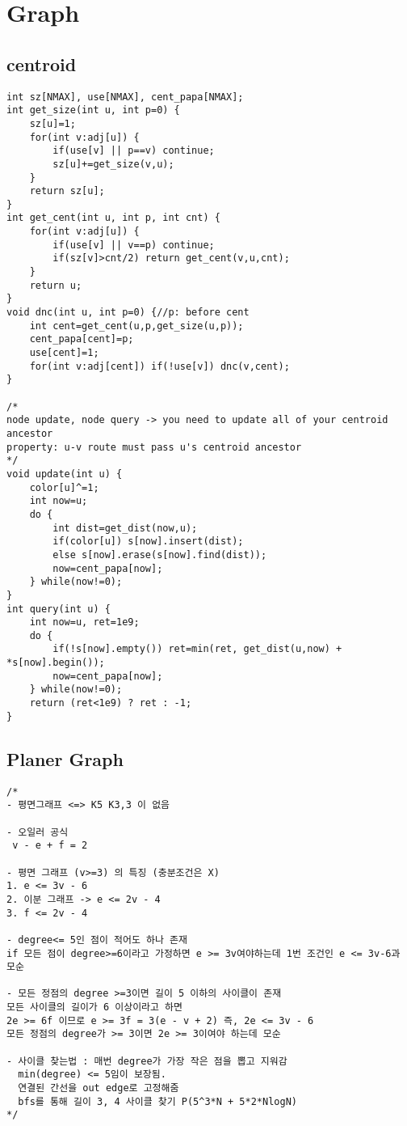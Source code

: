 \documentclass[landscape, 8pt, a4paper, oneside, twocolumn]{extarticle}
\begin{document}
\section{Graph}
\subsection {centroid}
\begin{verbatim}
int sz[NMAX], use[NMAX], cent_papa[NMAX];
int get_size(int u, int p=0) {
    sz[u]=1;
    for(int v:adj[u]) {
        if(use[v] || p==v) continue;
        sz[u]+=get_size(v,u);
    }
    return sz[u];
}
int get_cent(int u, int p, int cnt) {
    for(int v:adj[u]) {
        if(use[v] || v==p) continue;
        if(sz[v]>cnt/2) return get_cent(v,u,cnt);
    }
    return u;
}
void dnc(int u, int p=0) {//p: before cent
    int cent=get_cent(u,p,get_size(u,p));
    cent_papa[cent]=p;
    use[cent]=1;
    for(int v:adj[cent]) if(!use[v]) dnc(v,cent);
}

/*
node update, node query -> you need to update all of your centroid ancestor
property: u-v route must pass u's centroid ancestor 
*/
void update(int u) {
    color[u]^=1;
    int now=u;
    do {
        int dist=get_dist(now,u);
        if(color[u]) s[now].insert(dist);
        else s[now].erase(s[now].find(dist));
        now=cent_papa[now];
    } while(now!=0);    
}
int query(int u) {
    int now=u, ret=1e9;
    do {        
        if(!s[now].empty()) ret=min(ret, get_dist(u,now) + *s[now].begin());
        now=cent_papa[now];        
    } while(now!=0);
    return (ret<1e9) ? ret : -1;
}
\end{verbatim}
\newpage

\subsection{Planer Graph}
\begin{verbatim}
/*
- 평면그래프 <=> K5 K3,3 이 없음

- 오일러 공식 
 v - e + f = 2

- 평면 그래프 (v>=3) 의 특징 (충분조건은 X)
1. e <= 3v - 6
2. 이분 그래프 -> e <= 2v - 4
3. f <= 2v - 4

- degree<= 5인 점이 적어도 하나 존재
if 모든 점이 degree>=6이라고 가정하면 e >= 3v여야하는데 1번 조건인 e <= 3v-6과 모순

- 모든 정점의 degree >=3이면 길이 5 이하의 사이클이 존재
모든 사이클의 길이가 6 이상이라고 하면
2e >= 6f 이므로 e >= 3f = 3(e - v + 2) 즉, 2e <= 3v - 6
모든 정점의 degree가 >= 3이면 2e >= 3이여야 하는데 모순

- 사이클 찾는법 : 매번 degree가 가장 작은 점을 뽑고 지워감
  min(degree) <= 5임이 보장됨.
  연결된 간선을 out edge로 고정해줌
  bfs를 통해 길이 3, 4 사이클 찾기 P(5^3*N + 5*2*NlogN)
*/
\end{verbatim}
\end{document}
